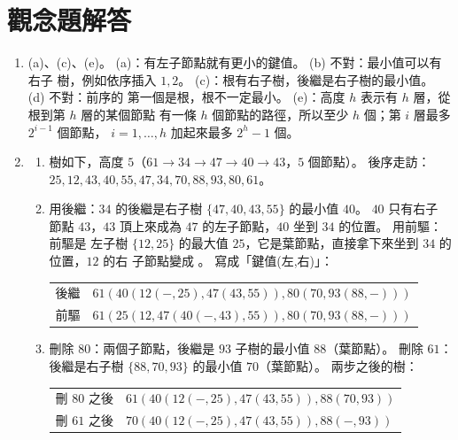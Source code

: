 \section*{觀念題解答}

\begin{enumerate}
\item (a)、(c)、(e)。 (a)：有左子節點就有更小的鍵值。 (b) 不對：最小值可以有右子
樹，例如依序插入 $1, 2$。 (c)：根有右子樹，後繼是右子樹的最小值。 (d) 不對：前序的
第一個是根，根不一定最小。 (e)：高度 $h$ 表示有 $h$ 層，從根到第 $h$ 層的某個節點
有一條 $h$ 個節點的路徑，所以至少 $h$ 個；第 $i$ 層最多 $2^{i-1}$ 個節點，
$i = 1, \ldots, h$ 加起來最多 $2^h - 1$ 個。

\item
\begin{enumerate}
\item 樹如下，高度 $5$（$61 \to 34 \to 47 \to 40 \to 43$，$5$ 個節點）。 後序走訪：$25,\allowbreak 12,\allowbreak 43,\allowbreak 40,\allowbreak 55,\allowbreak 47,\allowbreak 34,\allowbreak 70,\allowbreak 88,\allowbreak 93,\allowbreak 80,\allowbreak 61$。
\begin{center}
\end{center}

\item 用後繼：$34$ 的後繼是右子樹 $\{47, 40, 43, 55\}$ 的最小值 $40$。 $40$ 只有右子
節點 $43$，$43$ 頂上來成為 $47$ 的左子節點，$40$ 坐到 $34$ 的位置。 用前驅：前驅是
左子樹 $\{12, 25\}$ 的最大值 $25$，它是葉節點，直接拿下來坐到 $34$ 的位置，$12$ 的右
子節點變成 \NIL。 寫成「鍵值(左,右)」：
\begin{center}
\begin{tabular}{ll}
後繼 & $61(40(12(-,25),47(43,55)),80(70,93(88,-)))$ \\
前驅 & $61(25(12,47(40(-,43),55)),80(70,93(88,-)))$
\end{tabular}
\end{center}

\item 刪除 $80$：兩個子節點，後繼是 $93$ 子樹的最小值 $88$（葉節點）。 刪除 $61$：
後繼是右子樹 $\{88, 70, 93\}$ 的最小值 $70$（葉節點）。 兩步之後的樹：
\begin{center}
\begin{tabular}{ll}
刪 $80$ 之後 & $61(40(12(-,25),47(43,55)),88(70,93))$ \\
刪 $61$ 之後 & $70(40(12(-,25),47(43,55)),88(-,93))$
\end{tabular}
\end{center}
\end{enumerate}


\end{enumerate}
